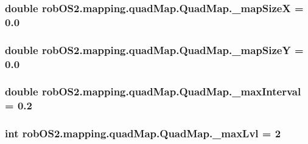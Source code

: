 \label{classrob_o_s2_1_1mapping_1_1quad_map_1_1_quad_map_a089973d65aee27b607e5d9a3d3752f71}
\hypertarget{classrob_o_s2_1_1mapping_1_1quad_map_1_1_quad_map_ab3ab527c4fa6bf6772168dd17b1319ec}{
\subsubsection[{\_\-mapSizeX}]{\setlength{\rightskip}{0pt plus 5cm}double {\bf robOS2.mapping.quadMap.QuadMap.\_\-mapSizeX} = 0.0}}
\label{classrob_o_s2_1_1mapping_1_1quad_map_1_1_quad_map_ab3ab527c4fa6bf6772168dd17b1319ec}
\hypertarget{classrob_o_s2_1_1mapping_1_1quad_map_1_1_quad_map_a456395906e38ca89d316332d00bc453c}{
\subsubsection[{\_\-mapSizeY}]{\setlength{\rightskip}{0pt plus 5cm}double {\bf robOS2.mapping.quadMap.QuadMap.\_\-mapSizeY} = 0.0}}
\label{classrob_o_s2_1_1mapping_1_1quad_map_1_1_quad_map_a456395906e38ca89d316332d00bc453c}
\hypertarget{classrob_o_s2_1_1mapping_1_1quad_map_1_1_quad_map_ad167b359063c6de323b09cce45d6f6c3}{
\subsubsection[{\_\-maxInterval}]{\setlength{\rightskip}{0pt plus 5cm}double {\bf robOS2.mapping.quadMap.QuadMap.\_\-maxInterval} = 0.2}}
\label{classrob_o_s2_1_1mapping_1_1quad_map_1_1_quad_map_ad167b359063c6de323b09cce45d6f6c3}
\hypertarget{classrob_o_s2_1_1mapping_1_1quad_map_1_1_quad_map_a944ce3b32759689afbafe7c58737e852}{
\subsubsection[{\_\-maxLvl}]{\setlength{\rightskip}{0pt plus 5cm}int {\bf robOS2.mapping.quadMap.QuadMap.\_\-maxLvl} = 2}}
